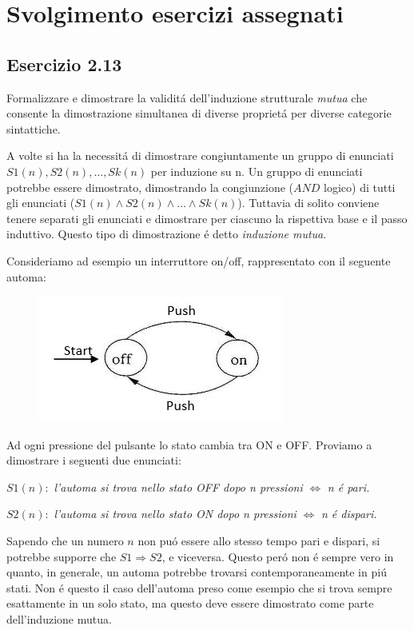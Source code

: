 \setcounter{secnumdepth}{0}
\chapter{Svolgimento esercizi assegnati}
	\section{Esercizio 2.13}
		\qquad Formalizzare e dimostrare la validit\'a dell'induzione strutturale
		\emph{mutua} che consente la dimostrazione simultanea di diverse propriet\'a
		per diverse categorie sintattiche.
		
		\sectionline
		
		\qquad A volte si ha la necessit\'a di dimostrare congiuntamente un gruppo di
		enunciati $S1(n),S2(n),\ldots,Sk(n)$ per induzione su n. Un gruppo di
		enunciati potrebbe essere dimostrato, dimostrando la congiunzione ($AND$
		logico) di tutti gli enunciati ($S1(n)\land S2(n)\land \ldots \land Sk(n)$).
		Tuttavia di solito conviene tenere separati gli enunciati e dimostrare per
		ciascuno la rispettiva base e il passo induttivo. Questo tipo di dimostrazione
		\'e detto \emph{induzione mutua}.
		
		Consideriamo ad esempio un interruttore on/off, rappresentato con il seguente
		automa:
		
		\begin{figure}[h]
			\centering
			\includegraphics[scale=1]{img/Interruttore}
		\end{figure}
		
		Ad ogni pressione del pulsante lo stato cambia tra ON e OFF. Proviamo a
		dimostrare i seguenti due enunciati:
		
		$S1(n):$ \emph{l'automa si trova nello stato OFF dopo n pressioni}
		$\Leftrightarrow$ \emph{n \'e pari.}
		
		$S2(n):$ \emph{l'automa si trova nello stato ON dopo n pressioni}
		$\Leftrightarrow$ \emph{n \'e dispari.}
		
		Sapendo che un numero $n$ non pu\'o essere allo stesso tempo pari e dispari, si
		potrebbe supporre che $S1 \Rightarrow S2$, e viceversa. Questo per\'o non \'e
		sempre vero in quanto, in generale, un automa potrebbe trovarsi
		contemporaneamente in pi\'u stati. Non \'e questo il caso dell'automa preso come
		esempio che si trova sempre esattamente in un solo stato, ma questo deve
		essere dimostrato come parte dell'induzione mutua.
		
